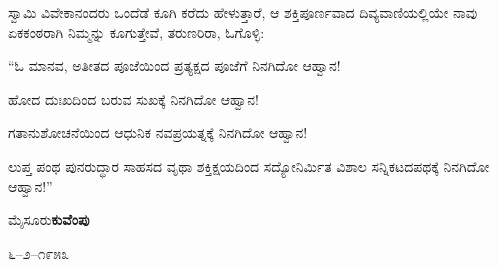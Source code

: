 ಸ್ವಾಮಿ ವಿವೇಕಾನಂದರು ಒಂದೆಡೆ ಕೂಗಿ ಕರೆದು ಹೇಳುತ್ತಾರೆ, ಆ ಶಕ್ತಿಪೂರ್ಣವಾದ ದಿವ್ಯವಾಣಿಯಲ್ಲಿಯೇ ನಾವು ಏಕಕಂಠರಾಗಿ ನಿಮ್ಮನ್ನು ಕೂಗುತ್ತೇವೆ, ತರುಣರಿರಾ, ಓಗೊಳ್ಳಿ: 

“ಓ ಮಾನವ, ಅತೀತದ ಪೂಜೆಯಿಂದ ಪ್ರತ್ಯಕ್ಷದ ಪೂಜೆಗೆ ನಿನಗಿದೋ ಆಹ್ವಾನ!

ಹೋದ ದುಃಖದಿಂದ ಬರುವ ಸುಖಕ್ಕೆ ನಿನಗಿದೋ ಆಹ್ವಾನ!

ಗತಾನುಶೋಚನೆಯಿಂದ ಆಧುನಿಕ ನವಪ್ರಯತ್ನಕ್ಕೆ ನಿನಗಿದೋ ಆಹ್ವಾನ!

ಲುಪ್ತ ಪಂಥ ಪುನರುದ್ಧಾರ ಸಾಹಸದ ವೃಥಾ ಶಕ್ತಿಕ್ಷಯದಿಂದ ಸದ್ಯೋನಿರ್ಮಿತ ವಿಶಾಲ ಸನ್ನಿಕಟದಪಥಕ್ಕೆ ನಿನಗಿದೋ ಆಹ್ವಾನ!”

\bigskip

\noindent
ಮೈಸೂರು\hfill \textbf{ಕುವೆಂಪು}

\noindent
೬–೨–೧೯೫೩

